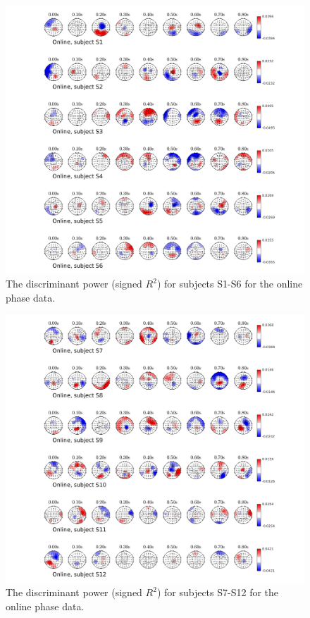 \documentclass[12pt]{iopart}
\begin{document}
\begin{figure}[h]
\center
    \includegraphics[trim={1cm 0.01cm 1cm 0cm},clip,width=1.0\columnwidth]{../images/TopoSignr2_Online_individual1.png}
    \caption{The discriminant power (signed $R^2$) for subjects S1-S6 for the online phase data.}
\label{fig:signRon1}
\end{figure}

\begin{figure}[h]
\center
    \includegraphics[trim={1cm 0.01cm 1cm 0cm},clip,width=1.0\columnwidth]{../images/TopoSignr2_Online_individual2.png}
    \caption{The discriminant power (signed $R^2$) for subjects S7-S12 for the online phase data.}
\label{fig:signRon2}
\end{figure}
\end{document}
